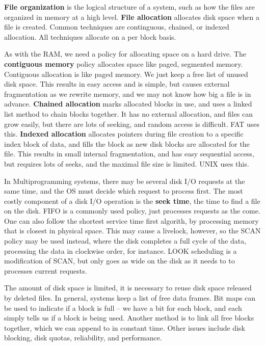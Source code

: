 {\bf File organization} is the logical structure of a system, such as how the files are organized in memory at a high level. {\bf File allocation} allocates disk space when a file is created. Common techniques are continguous, chained, or indexed allocation. All techniques allocate on a per block basis.

As with the RAM, we need a policy for allocating space on a hard drive. The {\bf contiguous memory} policy allocates space like paged, segmented memory. Contiguous allocation is like paged memory. We just keep a free list of unused disk space. This results in easy access and is simple, but causes external fragmentation as we rewrite memory, and we may not know how big a file is in advance. {\bf Chained allocation} marks allocated blocks in use, and uses a linked list method to chain blocks together. It has no external allocation, and files can grow easily, but there are lots of seeking, and random access is difficult. FAT uses this. {\bf Indexed allocation} allocates pointers during file creation to a specific index block of data, and fills the block as new disk blocks are allocated for the file. This results in small internal fragmentation, and has easy sequential access, but requires lots of seeks, and the maximal file size is limited. UNIX uses this.

In Multiprogramming systems, there may be several disk I/O requests at the same time, and the OS must decide which request to process first. The most costly component of a disk I/O operation is the {\bf seek time}, the time to find a file on the disk. FIFO is a commonly used policy, just processes requests as the come. One can also follow the shortest service time first algorith, by processing memory that is closest in physical space. This may cause a livelock, however, so the SCAN policy may be used instead, where the disk completes a full cycle of the data, processing the data in clockwise order, for instance. LOOK scheduling is a modification of SCAN, but only goes as wide on the disk as it needs to to processes current requests.

The amount of disk space is limited, it is necessary to reuse disk space released by deleted files. In general, systems keep a list of free data frames. Bit maps can be used to indicate if a block is full -- we have a bit for each block, and each simply tells us if a block is being used. Another method is to link all free blocks together, which we can append to in constant time. Other issues include disk blocking, disk quotas, reliability, and performance.

